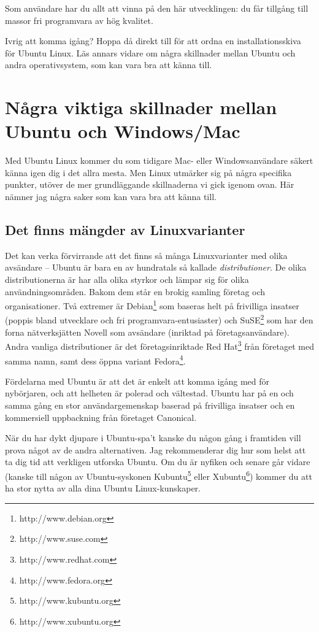 \documentclass[a4paper,final]{memoir} %
\begin{document}
Som användare har du allt att vinna på den här utvecklingen: du får tillgång till massor fri programvara av hög kvalitet. 

Ivrig att komma igång? Hoppa då direkt till  för att ordna en installationsskiva för Ubuntu Linux. Läs annars vidare om några skillnader mellan Ubuntu och andra operativsystem, som kan vara bra att känna till.

\section[Några viktiga skillnader mellan Ubuntu och Windows/Mac]{Några viktiga skillnader mellan Ubuntu och Windows/Mac}


Med Ubuntu Linux kommer du som tidigare Mac- eller Windowsanvändare säkert känna igen dig i det allra mesta. Men Linux utmärker sig på några specifika punkter, utöver de mer grundläggande skillnaderna vi gick igenom ovan. Här nämner jag några saker som kan vara bra att känna till.

\subsection{Det finns mängder av Linuxvarianter}

Det kan verka förvirrande att det finns så många Linuxvarianter med olika avsändare -- Ubuntu är bara en av hundratals så kallade \textit{distributioner}. De olika distributionerna är har alla olika styrkor och lämpar sig för olika användningsområden. Bakom dem står en brokig samling företag och organisationer. Två extremer är Debian\footnote{http://www.debian.org} som baseras helt på frivilliga insatser (poppis bland utvecklare och fri programvara-entusiaster) och SuSE\footnote{http://www.suse.com} som har den forna nätverksjätten Novell som avsändare (inriktad på företagsanvändare). Andra vanliga distributioner är det företagsinriktade Red Hat\footnote{http://www.redhat.com} från företaget med samma namn, samt dess öppna variant Fedora\footnote{http://www.fedora.org}.

Fördelarna med Ubuntu är att det är enkelt att komma igång med för nybörjaren, och att helheten är polerad och vältestad. Ubuntu har på en och samma gång en stor användargemenskap baserad på frivilliga insatser och en kommersiell uppbackning från företaget Canonical. 

När du har dykt djupare i Ubuntu-spa't kanske du någon gång i framtiden vill prova något av de andra alternativen. Jag rekommenderar dig hur som helst att ta dig tid att verkligen utforska Ubuntu. Om du är nyfiken och senare går vidare (kanske till någon av Ubuntu-syskonen Kubuntu\footnote{http://www.kubuntu.org} eller Xubuntu\footnote{http://www.xubuntu.org}) kommer du att ha stor nytta av alla dina Ubuntu Linux-kunskaper.
\end{document}
